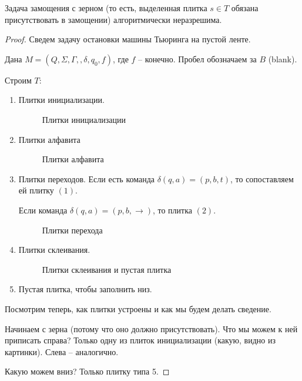 \begin{thm}
    Задача замощения с зерном (то есть, выделенная плитка $ s \in T $ обязана присутствовать в замощении) алгоритмически неразрешима.
\end{thm}
\begin{proof}
    Сведем задачу остановки машины Тьюринга на пустой ленте.

    Дана $ M = (Q, \Sigma, \Gamma, , \delta, q_0, f)$, где $ f $ -- конечно. Пробел обозначаем за $B$ (blank).

    Строим $T$:
    \begin{enumerate}
        \item Плитки инициализации.
\begin{figure}[ht]
    \centering
	\caption{Плитки инициализации}
    \label{fig:init-tails}
\end{figure}
        \item  Плитки алфавита
\begin{figure}[ht]
    \centering
    \caption{Плитки алфавита}
    \label{fig:alphabet-tails}
\end{figure}
        \item Плитки переходов. 
			Если есть команда $ \delta(q, a) = (p, b, t) $, то сопоставляем
			ей плитку $ (1)$.

			Если команда $ \delta(q, a) = (p, b, \rightarrow) $, то плитка  $ (2)$.
\begin{figure}[ht]
    \centering
    \caption{Плитки перехода}
    \label{fig:delta-tails}
\end{figure}
        \item Плитки склеивания.
\begin{figure}[h!]
    \centering
    \caption{Плитки склеивания и пустая плитка}
    \label{fig:bonding-tails}
\end{figure}
        \item Пустая плитка, чтобы заполнить низ. 
    \end{enumerate}

    Посмотрим теперь, как плитки устроены и как мы будем делать сведение.

    Начинаем с зерна (потому что оно должно присутствовать). Что мы можем к ней приписать справа?
    Только одну из плиток инициализации (какую, видно из картинки). Слева -- аналогично.

    Какую можем вниз? Только плитку типа 5.


\end{proof}
